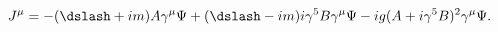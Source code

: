\begin{equation}
\label{eq:supercurrent}
  J^\mu=-(\dslash+im)A\gamma^\mu\Psi 
        +(\dslash-im)i\gamma^5B\gamma^\mu\Psi
        -ig(A+i\gamma^5B)^2\gamma^\mu\Psi.
\end{equation}

